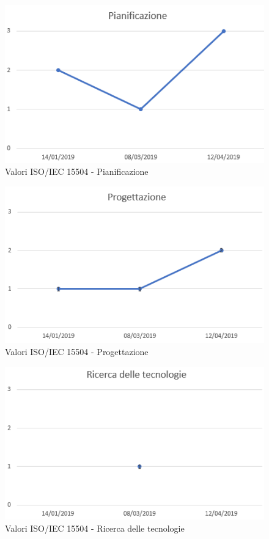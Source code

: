 \begin{figure}[H]
	\centering
	\includegraphics[scale=1]{images/resoconto/Pianificazione.png}
	\caption{Valori ISO/IEC 15504 - Pianificazione}	
\end{figure}


\begin{figure}[H]
	\centering
	\includegraphics[scale=1]{images/resoconto/Progettazione.png}
	\caption{Valori ISO/IEC 15504 - Progettazione}	
\end{figure}


\begin{figure}[H]
	\centering
	\includegraphics[scale=1]{images/resoconto/Ricerca.png}
	\caption{Valori ISO/IEC 15504 - Ricerca delle tecnologie}	
\end{figure}


